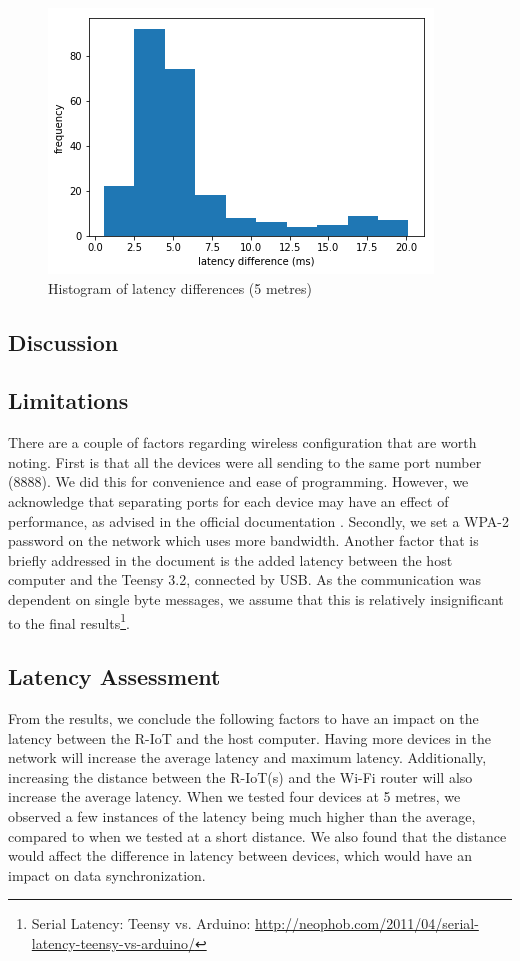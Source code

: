 \begin{figure}[ht]
  \centering
    \includegraphics[width=\textwidth]{Chapters/Figures/technical/Latency/figure7.png}
    \caption{Histogram of latency differences (5 metres)}
    \label{fig:latency_fig7}
\end{figure}

\subsection{Discussion}

\subsection{Limitations}
There are a couple of factors regarding wireless configuration that are worth noting. First is that all the devices were all sending to the same port number (8888). We did this for convenience and ease of programming. However, we acknowledge that separating ports for each device may have an effect of performance, as advised in the official documentation \cite{BITalino R-IoT User Manual}. Secondly, we set a WPA-2 password on the network which uses more bandwidth. Another factor that is briefly addressed in the document is the added latency between the host computer and the Teensy 3.2, connected by USB. As the communication was dependent on single byte messages, we assume that this is relatively insignificant to the final results\footnote{Serial Latency: Teensy vs. Arduino: \url{http://neophob.com/2011/04/serial-latency-teensy-vs-arduino/}}.

\subsection{Latency Assessment}

From the results, we conclude the following factors to have an impact on the latency between the R-IoT and the host computer. Having more devices in the network will increase the average latency and maximum latency. Additionally, increasing the distance between the R-IoT(s) and the Wi-Fi router will also increase the average latency. When we tested four devices at 5 metres, we observed a few instances of the latency being much higher than the average, compared to when we tested at a short distance. We also found that the distance would affect the difference in latency between devices, which would have an impact on data synchronization.
